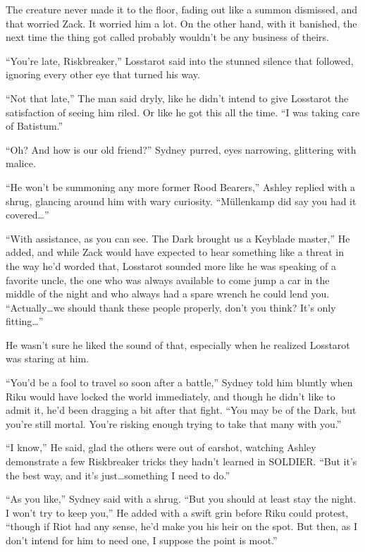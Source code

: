 The creature never made it to the floor, fading out like a summon dismissed, and that worried Zack. It worried him a lot. On the other hand, with it banished, the next time the thing got called probably wouldn't be any business of theirs.

``You're late, Riskbreaker,'' Losstarot said into the stunned silence that followed, ignoring every other eye that turned his way.

``Not that late,'' The man said dryly, like he didn't intend to give Losstarot the satisfaction of seeing him riled. Or like he got this all the time. ``I was taking care of Batistum.''

``Oh? And how is our old friend?'' Sydney purred, eyes narrowing, glittering with malice.

``He won't be summoning any more former Rood Bearers,'' Ashley replied with a shrug, glancing around him with wary curiosity. ``Müllenkamp did say you had it covered\ldots''

``With assistance, as you can see. The Dark brought us a Keyblade master,'' He added, and while Zack would have expected to hear something like a threat in the way he'd worded that, Losstarot sounded more like he was speaking of a favorite uncle, the one who was always available to come jump a car in the middle of the night and who always had a spare wrench he could lend you. ``Actually\ldots we should thank these people properly, don't you think? It's only fitting\ldots''

He wasn't sure he liked the sound of that, especially when he realized Losstarot was staring at him.


\scenechange


``You'd be a fool to travel so soon after a battle,'' Sydney told him bluntly when Riku would have locked the world immediately, and though he didn't like to admit it, he'd been dragging a bit after that fight. ``You may be of the Dark, but you're still mortal. You're risking enough trying to take that many with you.''

``I know,'' He said, glad the others were out of earshot, watching Ashley demonstrate a few Riskbreaker tricks they hadn't learned in SOLDIER. ``But it's the best way, and it's just\ldots something I need to do.''

``As you like,'' Sydney said with a shrug. ``But you should at least stay the night. I won't try to keep you,'' He added with a swift grin before Riku could protest, ``though if Riot had any sense, he'd make you his heir on the spot. But then, as I don't intend for him to need one, I suppose the point is moot.''

